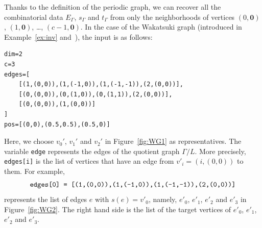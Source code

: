 \documentclass[11pt]{article}
\theoremstyle{definition}
\numberwithin{equation}{section}
\begin{document}
Thanks to the definition of the periodic graph, we can recover all the combinatorial data $E_{\Gamma}$, $s_{\Gamma}$ and $t_{\Gamma}$ from only the neighborhoods of vertices $(0,\mathbf{0})$, $(1,\mathbf{0})$, \dots, $(c-1,\mathbf{0})$.
In the case of the Wakatsuki graph (introduced in Example~\ref{ex:inv} and~\cite[Example~2.6]{IN}), the input is as follows:
\begin{lstlisting}
dim=2
c=3
edges=[
    [(1,(0,0)),(1,(-1,0)),(1,(-1,-1)),(2,(0,0))],
    [(0,(0,0)),(0,(1,0)),(0,(1,1)),(2,(0,0))],
    [(0,(0,0)),(1,(0,0))]
]
pos=[(0,0),(0.5,0.5),(0.5,0)]
\end{lstlisting}
Here, we choose $v_0'$, $v_1'$ and $v_2'$ in Figure~\ref{fig:WG1} as representatives.
The variable \verb~edge~ represents the edges of the quotient graph $\Gamma / L$.
More precisely, \verb~edges[i]~ is the list of vertices that have an edge from $v'_i = (i,(0,0))$ to them. 
For example, 
\[
\text{\verb~edges[0] = [(1,(0,0)),(1,(-1,0)),(1,(-1,-1)),(2,(0,0))]~}
\]
represents the list of edges $e$ with $s(e) = v'_0$, namely, $e'_0$, $e'_1$, $e'_2$ and $e'_3$ in Figure~\ref{fig:WG2}. 
The right hand side is the list of the target vertices of $e'_0$, $e'_1$, $e'_2$ and $e'_3$. 
\end{document}
